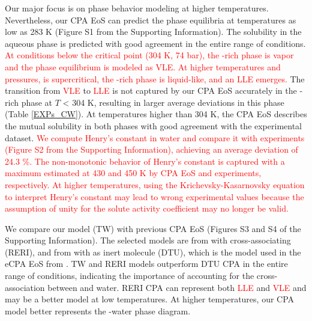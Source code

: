 Our major focus is on phase behavior modeling at higher temperatures. Nevertheless, our CPA EoS can predict the phase equilibria at temperatures as low as 283 K (Figure S1 from the Supporting Information). The  solubility in the aqueous phase is predicted with good agreement in the entire range of conditions. \textcolor{red}{At conditions below the  critical point (304 K, 74 bar), the -rich phase is vapor and the phase equilibrium is modeled as VLE. At higher temperatures and pressures,  is supercritical, the -rich phase is liquid-like, and an LLE emerges.} The transition from \textcolor{red}{VLE} to \textcolor{red}{LLE} is not captured by our CPA EoS accurately in the -rich phase at $T$ < 304 K, resulting in larger average deviations in this phase (Table \ref{EXPs_CW}). At temperatures higher than 304 K, the CPA EoS describes the mutual solubility in both phases with good agreement with the experimental dataset. \textcolor{red}{We compute  Henry's constant in water and compare it with experiments (Figure S2 from the Supporting Information), achieving an average deviation of 24.3 \%. The non-monotonic behavior of  Henry's constant is captured with a maximum estimated at 430 and 450 K by CPA EoS and experiments, respectively. At higher temperatures, using the Krichevsky-Kasarnovsky equation to interpret Henry's constant may lead to wrong experimental values because the assumption of unity for the solute activity coefficient may no longer be valid.}   

We compare our model (TW) with previous CPA EoS (Figures S3 and S4 of the Supporting Information). The selected models are from \citeauthor{Li2009} \cite{Li2009} with cross-associating  (RERI), and from \citeauthor{Tsivintzelis2011} \cite{Tsivintzelis2011} with  as inert molecule (DTU), which is the model used in the eCPA EoS from \citeauthor{Maribo2015} \cite{Maribo2015}. TW and RERI models outperform DTU CPA in the entire range of conditions, indicating the importance of accounting for the cross-association between  and water. RERI CPA can represent both \textcolor{red}{LLE} and \textcolor{red}{VLE} and may be a better model at low temperatures. At higher temperatures, our CPA model better represents the -water phase diagram.

